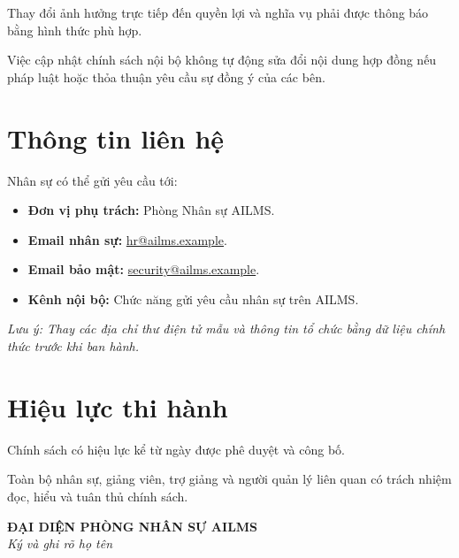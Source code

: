 \documentclass[12pt,a4paper]{article}
\begin{document}
Thay đổi ảnh hưởng trực tiếp đến quyền lợi và nghĩa vụ
phải được thông báo bằng hình thức phù hợp.

Việc cập nhật chính sách nội bộ không tự động sửa đổi nội dung hợp đồng
nếu pháp luật hoặc thỏa thuận yêu cầu sự đồng ý của các bên.

\section{Thông tin liên hệ}

Nhân sự có thể gửi yêu cầu tới:

\begin{itemize}
    \item \textbf{Đơn vị phụ trách:} Phòng Nhân sự AILMS.
    \item \textbf{Email nhân sự:}
    \href{mailto:hr@ailms.example}{hr@ailms.example}.
    \item \textbf{Email bảo mật:}
    \href{mailto:security@ailms.example}{security@ailms.example}.
    \item \textbf{Kênh nội bộ:} Chức năng gửi yêu cầu nhân sự trên AILMS.
\end{itemize}

\textcolor{ailmsred}{
\textit{Lưu ý: Thay các địa chỉ thư điện tử mẫu và thông tin tổ chức
bằng dữ liệu chính thức trước khi ban hành.}
}

\section{Hiệu lực thi hành}

Chính sách có hiệu lực kể từ ngày được phê duyệt và công bố.

Toàn bộ nhân sự, giảng viên, trợ giảng và người quản lý liên quan
có trách nhiệm đọc, hiểu và tuân thủ chính sách.

\vfill

\begin{center}
    \textbf{ĐẠI DIỆN PHÒNG NHÂN SỰ AILMS}\\[1.5cm]
    \textit{Ký và ghi rõ họ tên}
\end{center}
\end{document}
